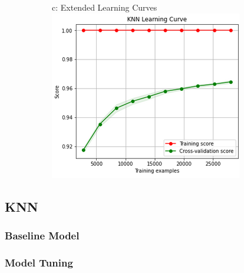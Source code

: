 \documentclass{article}
\begin{document}
\begin{figure}
\begin{subfigure}{.30\textwidth}
	\end{subfigure}
	\begin{subfigure}{.34\textwidth}
		\centering
		c: Extended Learning Curves\\
		\includegraphics[width=\linewidth]{mnist_knn_learning2.png}
		
	\end{subfigure}
	\label{fig:test}
\end{figure}




\subsection{KNN}
\subsubsection*{Baseline Model}
\subsubsection*{Model Tuning}
\end{document}
